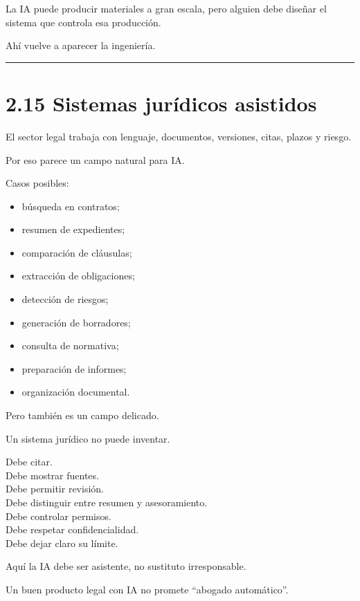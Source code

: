 La IA puede producir materiales a gran escala, pero alguien debe diseñar
el sistema que controla esa producción.

Ahí vuelve a aparecer la ingeniería.

\begin{center}\rule{0.5\linewidth}{0.5pt}\end{center}

\section{2.15 Sistemas jurídicos
asistidos}\label{sistemas-juruxeddicos-asistidos}

El sector legal trabaja con lenguaje, documentos, versiones, citas,
plazos y riesgo.

Por eso parece un campo natural para IA.

Casos posibles:

\begin{itemize}
\tightlist
\item
  búsqueda en contratos;
\item
  resumen de expedientes;
\item
  comparación de cláusulas;
\item
  extracción de obligaciones;
\item
  detección de riesgos;
\item
  generación de borradores;
\item
  consulta de normativa;
\item
  preparación de informes;
\item
  organización documental.
\end{itemize}

Pero también es un campo delicado.

Un sistema jurídico no puede inventar.

Debe citar.\\
Debe mostrar fuentes.\\
Debe permitir revisión.\\
Debe distinguir entre resumen y asesoramiento.\\
Debe controlar permisos.\\
Debe respetar confidencialidad.\\
Debe dejar claro su límite.

Aquí la IA debe ser asistente, no sustituto irresponsable.

Un buen producto legal con IA no promete ``abogado automático''.

